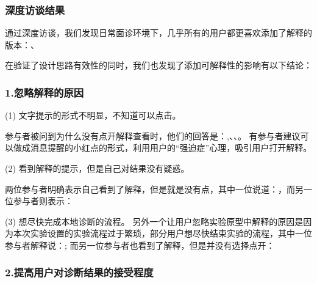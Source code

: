 




\subsubsection{深度访谈结果}



通过深度访谈，我们发现日常面诊环境下，几乎所有的用户都更喜欢添加了解释的版本：、

在验证了设计思路有效性的同时，我们也发现了添加可解释性的影响有以下结论：

\subsubsection{1.忽略解释的原因}
(1) 文字提示的形式不明显，不知道可以点击。

参与者被问到为什么没有点开解释查看时，他们的回答是：,、、。
有参与者建议可以做成消息提醒的小红点的形式，利用用户的“强迫症”心理，吸引用户打开解释。

(2) 看到解释的提示，但是自己对结果没有疑惑。

两位参与者明确表示自己看到了解释，但是就是没有点，其中一位说道：，而另一位参与者则表示：


(3) 想尽快完成本地诊断的流程。
 另外一个让用户忽略实验原型中解释的原因是因为本次实验设置的实验流程过于繁琐，部分用户想尽快结束实验的流程，其中一位参与者解释说：;
 而另一位参与者也看到了解释，但是并没有选择点开：

\subsubsection{2.提高用户对诊断结果的接受程度}

